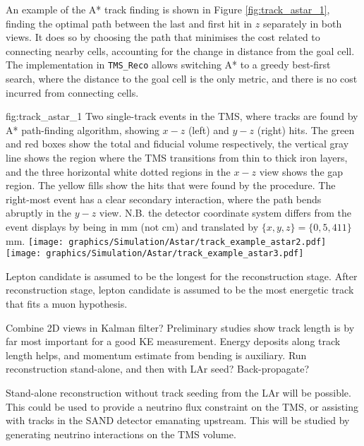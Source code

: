 An example of the A* track finding is shown in Figure \ref{fig:track_astar_1}, finding the optimal path between the last and first hit in $z$ separately in both views. It does so by choosing the path that minimises the cost related to connecting nearby cells, accounting for the change in distance from the goal cell. The implementation in \texttt{TMS\_Reco} allows switching A* to a greedy best-first search, where the distance to the goal cell is the only metric, and there is no cost incurred from connecting cells.
\begin{dunefigure}[]{fig:track_astar_1}
{Two single-track events in the TMS, where tracks are found by A* path-finding algorithm, showing $x-z$ (left) and $y-z$ (right) hits. The green and red boxes show the total and fiducial volume respectively, the vertical gray line shows the region where the TMS transitions from thin to thick iron layers, and the three horizontal white dotted regions in the $x-z$ view shows the gap region. The yellow fills show the hits that were found by the procedure. The right-most event has a clear secondary interaction, where the path bends abruptly in the $y-z$ view. N.B. the detector coordinate system differs from the event displays by being in mm (not cm) and translated by $\{x,y,z\}=\{0, 5, 411\}$ mm. }
\texttt{[image: graphics/Simulation/Astar/track\_example\_astar2.pdf]} \texttt{[image: graphics/Simulation/Astar/track\_example\_astar3.pdf]}
\end{dunefigure}

Lepton candidate is assumed to be the longest for the reconstruction stage. After reconstruction stage, lepton candidate is assumed to be the most energetic track that fits a muon hypothesis.

Combine 2D views in Kalman filter? Preliminary studies show track length is by far most important for a good KE measurement. Energy deposits along track length helps, and momentum estimate from bending is auxiliary. Run reconstruction stand-alone, and then with LAr seed? Back-propagate?

Stand-alone reconstruction without track seeding from the LAr will be possible. This could be used to provide a neutrino flux constraint on the TMS, or assisting with tracks in the SAND detector emanating upstream. This will be studied by generating neutrino interactions on the TMS volume.


